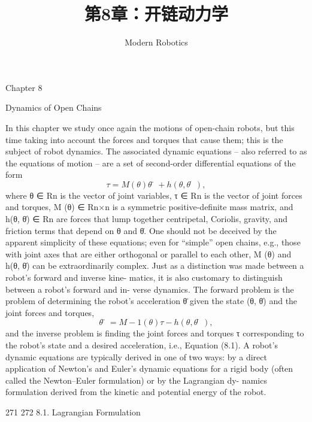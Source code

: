 \documentclass[12pt,a4paper]{article}
\title{第8章：开链动力学}
\author{Modern Robotics}
\date{}
\begin{document}
\maketitle

Chapter 8

Dynamics of Open Chains

In this chapter we study once again the motions of open-chain robots, but this
time taking into account the forces and torques that cause them; this is the
subject of robot dynamics. The associated dynamic equations – also referred
to as the equations of motion – are a set of second-order differential equations
of the form
\begin{equation}
τ = M (θ)θ̈ + h(θ, θ̇),
\label{eq:8.1}
\end{equation}
where θ ∈ Rn is the vector of joint variables, τ ∈ Rn is the vector of joint forces
and torques, M (θ) ∈ Rn×n is a symmetric positive-definite mass matrix, and
h(θ, θ̇) ∈ Rn are forces that lump together centripetal, Coriolis, gravity, and
friction terms that depend on θ and θ̇. One should not be deceived by the
apparent simplicity of these equations; even for “simple” open chains, e.g., those
with joint axes that are either orthogonal or parallel to each other, M (θ) and
h(θ, θ̇) can be extraordinarily complex.
    Just as a distinction was made between a robot’s forward and inverse kine-
matics, it is also customary to distinguish between a robot’s forward and in-
verse dynamics. The forward problem is the problem of determining the
robot’s acceleration θ̈ given the state (θ, θ̇) and the joint forces and torques,
                                                     
\begin{equation}
θ̈ = M −1 (θ) τ − h(θ, θ̇) ,
\label{eq:8.2}
\end{equation}
and the inverse problem is finding the joint forces and torques τ corresponding
to the robot’s state and a desired acceleration, i.e., Equation (8.1).
    A robot’s dynamic equations are typically derived in one of two ways: by a
direct application of Newton’s and Euler’s dynamic equations for a rigid body
(often called the Newton–Euler formulation) or by the Lagrangian dy-
namics formulation derived from the kinetic and potential energy of the robot.

                                        271
272                                                                 8.1. Lagrangian Formulation
\end{document}
